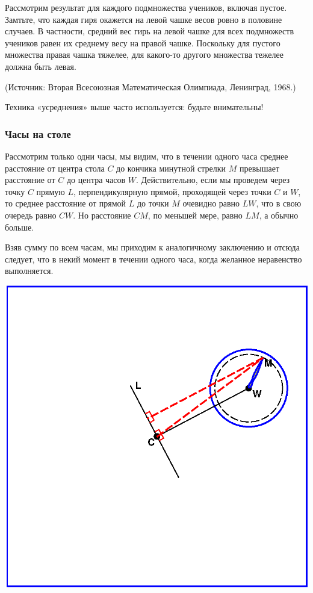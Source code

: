 Рассмотрим результат для каждого подмножества учеников, включая пустое.
Замтьте, что каждая гиря окажется на левой чашке весов ровно в половине случаев.
В частности, средний вес гирь на левой чашке для всех подмножеств учеников равен их среднему весу на правой чашке. 
Поскольку для пустого множества правая чашка тяжелее, 
для какого-то другого множества тежелее должна быть левая.

(Источник: Вторая Всесоюзная Математическая Олимпиада, Ленинград, 1968.)\heart


Техника «усреднения» выше часто используется: будьте внимательны!


\subsubsection*{Часы на столе} %


Рассмотрим только одни часы, 
мы видим, что в течении одного часа среднее расстояние от центра стола $C$ до кончика минутной стрелки $M$ превышает  расстояние от $C$ до центра часов $W$.  
Действительно, если мы проведем через точку $C$ прямую $L$, перпендикулярную прямой, проходящей через точки $C$ и $W$, 
то среднее расстояние от прямой  $L$  до точки $M$ очевидно равно $LW$, 
что в свою очередь равно $CW$.  
Но расстояние $CM$, по меньшей мере, равно $LM$, а обычно больше.

Взяв сумму по всем часам, мы приходим  к аналогичному заключению и отсюда следует, что в некий момент в течении одного часа, когда желанное неравенство выполняется.\heart


\begin{center}
\includegraphics[scale=0.6]{Figs/Insight/watch}
\end{center}

